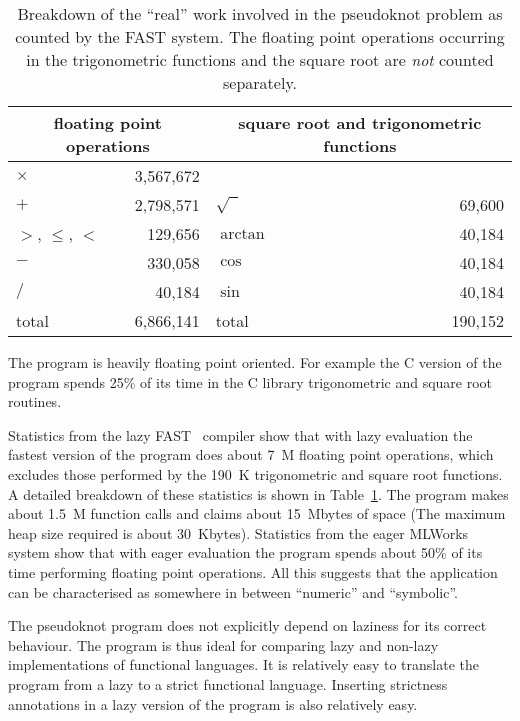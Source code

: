 \begin{table}
\begin{center}
\begin{tabular}{|l|r|l|r|}
\hline
\multicolumn{2}{|c}{floating point operations} &
\multicolumn{2}{|c|}{square root and trigonometric functions} \\
\hline
$\times$         & 3,567,672 &                &         \\
$+$              & 2,798,571 & $\sqrt{\;\;}$  &  69,600 \\
$>$, $\leq$, $<$ &   129,656 & $\arctan$      &  40,184 \\
$-$              &   330,058 & $\cos$         &  40,184 \\
$/$              &    40,184 & $\sin$         &  40,184 \\
\hline
total            & 6,866,141 & total          & 190,152 \\
\hline
\end{tabular}
\end{center}
\caption{Breakdown of the ``real'' work involved in the pseudoknot
problem as counted by the FAST system. The floating point operations
occurring in the trigonometric functions and the square root are {\em
not} counted separately.}
\label{tbl:float}
\end{table}

The program is heavily floating point oriented. For example the C
version of the program spends 25\% of its time in the C library
trigonometric and square root routines.

Statistics from the lazy FAST~\cite{Har91} compiler show that with lazy
evaluation the fastest version of the program does about 7~M floating
point operations, which excludes those performed by the 190~K
trigonometric and square root functions. A detailed breakdown of these
statistics is shown in Table~\ref{tbl:float}. The program makes about
1.5~M function calls and claims about 15~Mbytes of space (The maximum
heap size required is about 30~Kbytes).
Statistics from the eager MLWorks system show that with eager
evaluation the program spends about 50\% of its time performing
floating point operations.
All this suggests that the application can be characterised as
somewhere in between ``numeric'' and ``symbolic''.

The pseudoknot program does not explicitly depend on laziness for its
correct behaviour. The program is thus ideal for comparing lazy and
non-lazy implementations of functional languages. It is relatively easy
to translate the program from a lazy to a strict functional
language. Inserting strictness annotations in a lazy version of the
program is also relatively easy.

